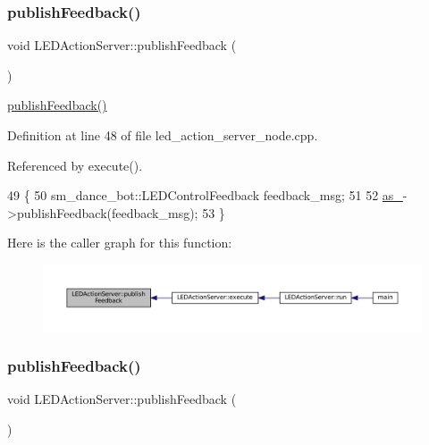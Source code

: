 \subsubsection{\texorpdfstring{publish\+Feedback()}{publishFeedback()}\hspace{0.1cm}{\footnotesize\ttfamily [3/5]}}
{\footnotesize\ttfamily void L\+E\+D\+Action\+Server\+::publish\+Feedback (\begin{DoxyParamCaption}{ }\end{DoxyParamCaption})\hspace{0.3cm}{\ttfamily [inline]}}

\hyperlink{classLEDActionServer_a25c93d4e7ecdacbb4f5b090d7789aa36}{publish\+Feedback()} 

Definition at line 48 of file led\+\_\+action\+\_\+server\+\_\+node.\+cpp.



Referenced by execute().


\begin{DoxyCode}
49 \{
50     sm\_dance\_bot::LEDControlFeedback feedback\_msg;
51     
52     \hyperlink{classLEDActionServer_a61d21c77642081acf017d4ebd65b2de0}{as\_}->publishFeedback(feedback\_msg);
53 \}
\end{DoxyCode}
Here is the caller graph for this function\+:
\nopagebreak
\begin{figure}[H]
\begin{center}
\leavevmode
\includegraphics[width=350pt]{classLEDActionServer_a25c93d4e7ecdacbb4f5b090d7789aa36_icgraph}
\end{center}
\end{figure}
\mbox{\label{classLEDActionServer_a25c93d4e7ecdacbb4f5b090d7789aa36}} 
\subsubsection{\texorpdfstring{publish\+Feedback()}{publishFeedback()}\hspace{0.1cm}{\footnotesize\ttfamily [4/5]}}
{\footnotesize\ttfamily void L\+E\+D\+Action\+Server\+::publish\+Feedback (\begin{DoxyParamCaption}{ }\end{DoxyParamCaption})\hspace{0.3cm}{\ttfamily [inline]}}

